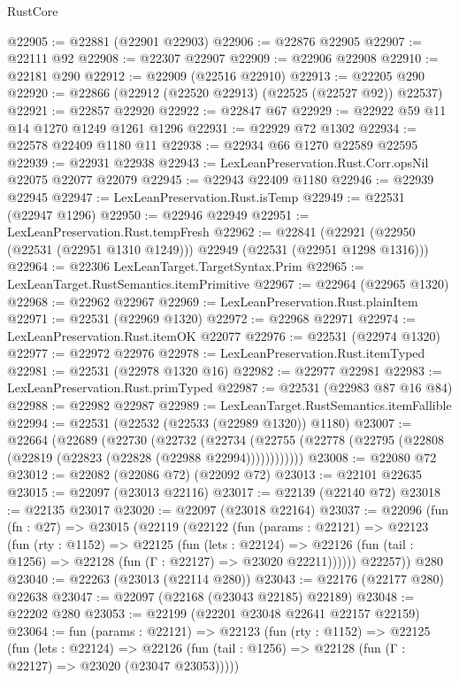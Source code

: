 \begin{lexlean}{RustCore}
\begin{coremodule}
@22905 := @22881 (@22901 @22903)
@22906 := @22876 @22905
@22907 := @22111 @92
@22908 := @22307 @22907
@22909 := @22906 @22908
@22910 := @22181 @290
@22912 := @22909 (@22516 @22910)
@22913 := @22205 @290
@22920 := @22866 (@22912 (@22520 @22913) (@22525 (@22527 @92)) @22537)
@22921 := @22857 @22920
@22922 := @22847 @67
@22929 := @22922 @59 @11 @14 @1270 @1249 @1261 @1296
@22931 := @22929 @72 @1302
@22934 := @22578 @22409 @1180 @11
@22938 := @22934 @66 @1270 @22589 @22595
@22939 := @22931 @22938
@22943 := LexLeanPreservation.Rust.Corr.opsNil @22075 @22077 @22079
@22945 := @22943 @22409 @1180
@22946 := @22939 @22945
@22947 := LexLeanPreservation.Rust.isTemp
@22949 := @22531 (@22947 @1296)
@22950 := @22946 @22949
@22951 := LexLeanPreservation.Rust.tempFresh
@22962 := @22841
    (@22921 (@22950 (@22531 (@22951 @1310 @1249))) @22949 (@22531 (@22951 @1298 @1316)))
@22964 := @22306 LexLeanTarget.TargetSyntax.Prim
@22965 := LexLeanTarget.RustSemantics.itemPrimitive
@22967 := @22964 (@22965 @1320)
@22968 := @22962 @22967
@22969 := LexLeanPreservation.Rust.plainItem
@22971 := @22531 (@22969 @1320)
@22972 := @22968 @22971
@22974 := LexLeanPreservation.Rust.itemOK @22077
@22976 := @22531 (@22974 @1320)
@22977 := @22972 @22976
@22978 := LexLeanPreservation.Rust.itemTyped
@22981 := @22531 (@22978 @1320 @16)
@22982 := @22977 @22981
@22983 := LexLeanPreservation.Rust.primTyped
@22987 := @22531 (@22983 @87 @16 @84)
@22988 := @22982 @22987
@22989 := LexLeanTarget.RustSemantics.itemFallible
@22994 := @22531 (@22532 (@22533 (@22989 @1320)) @1180)
@23007 := @22664
    (@22689
      (@22730
        (@22732
          (@22734 (@22755 (@22778 (@22795 (@22808 (@22819 (@22823 (@22828 (@22988 @22994))))))))))))
@23008 := @22080 @72
@23012 := @22082 (@22086 @72) (@22092 @72)
@23013 := @22101 @22635
@23015 := @22097 (@23013 @22116)
@23017 := @22139 (@22140 @72)
@23018 := @22135 @23017
@23020 := @22097 (@23018 @22164)
@23037 := @22096
    (fun (fn : @27) =>
    @23015
      (@22119
        (@22122
          (fun (params : @22121) =>
          @22123
            (fun (rty : @1152) =>
            @22125
              (fun (lets : @22124) =>
              @22126 (fun (tail : @1256) => @22128 (fun (Γ : @22127) => @23020 @22211))))))
        @22257))
    @280
@23040 := @22263 (@23013 (@22114 @280))
@23043 := @22176 (@22177 @280) @22638
@23047 := @22097 (@22168 (@23043 @22185) @22189)
@23048 := @22202 @280
@23053 := @22199 (@22201 @23048 @22641 @22157 @22159)
@23064 := fun (params : @22121) =>
  @22123
    (fun (rty : @1152) =>
    @22125
      (fun (lets : @22124) =>
      @22126 (fun (tail : @1256) => @22128 (fun (Γ : @22127) => @23020 (@23047 @23053)))))

\end{coremodule}
\end{lexlean}

